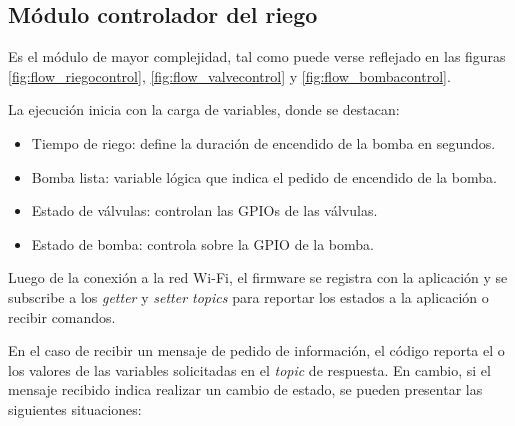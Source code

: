 \pagebreak
\subsection{Módulo controlador del riego}
\label{Módulo controlador del riego}

Es el módulo de mayor complejidad, tal como puede verse reflejado en las figuras \ref{fig:flow_riegocontrol}, \ref{fig:flow_valvecontrol}  y \ref{fig:flow_bombacontrol}.

La ejecución inicia con la carga de variables, donde se destacan:
\begin{itemize}
\item Tiempo de riego: define la duración de encendido de la bomba en segundos.
\item Bomba lista: variable lógica que indica el pedido de encendido de la bomba.
\item Estado de válvulas: controlan las GPIOs de las válvulas.
\item Estado de bomba: controla sobre la GPIO de la bomba.
\end{itemize}

Luego de la conexión a la red Wi-Fi, el firmware se registra con la aplicación y se subscribe a los \textit{getter} y \textit{setter topics} para reportar los estados a la aplicación o recibir comandos.


En el caso de recibir un mensaje de pedido de información, el código reporta el o los valores de las variables solicitadas en el \textit{topic} de respuesta. En cambio, si el mensaje recibido indica realizar un cambio de estado, se pueden presentar las siguientes situaciones:

